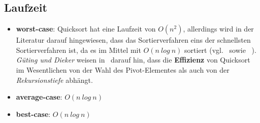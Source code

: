 \subsection{Laufzeit}
\begin{itemize}
    \item \textbf{worst-case}: Quicksort hat eine Laufzeit von $O(n^2)$, allerdings wird in der Literatur darauf hingewiesen, dass das Sortierverfahren eins der schnellsten Sortierverfahren ist, da es im Mittel mit $O(n\ log\ n)$ sortiert (vgl.~\cite[92]{OW17b} sowie ~\cite[173]{GD18e}).\\
    \textit{Güting und Dieker} weisen in~\cite[182 f.]{GD18e} darauf hin, dass die \textbf{Effizienz} von Quicksort im Wesentlichen von der Wahl des Pivot-Elementes als auch von der \textit{Rekursionstiefe} abhängt.
    \item \textbf{average-case}: $O(n\ log\ n)$
    \item \textbf{best-case}: $O(n\ log\ n)$
\end{itemize}